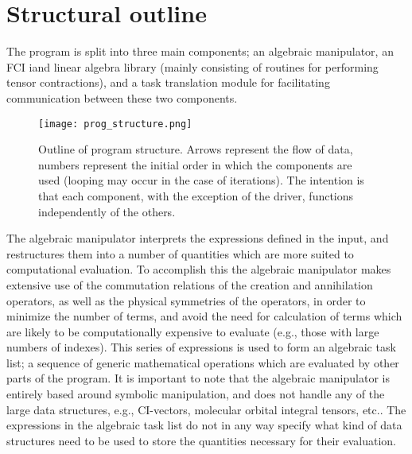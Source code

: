 \section{Structural outline}
\noindent The program is split into three main components; an algebraic manipulator, an FCI
iand linear algebra library (mainly consisting of routines for performing tensor contractions),
and a task translation module for facilitating communication between these two components.\\

\begin{figure}[!ht]
\begin{center}
\texttt{[image: prog\_structure.png]}
\caption{ Outline of program structure. Arrows represent the flow of data, numbers represent the
initial order in which the components are used (looping may occur in the case of iterations).
The intention is that each component, with the exception of the driver, functions independently of the others.}
\end{center}
\label{fig:prog_structure}
\end{figure}

\noindent The algebraic manipulator interprets the expressions defined
in the input, and restructures them into a number of quantities which are
more suited to computational evaluation. To accomplish this the
algebraic manipulator makes extensive use of the commutation
relations of the creation and annihilation operators, as well as the physical
symmetries of the operators, in order to minimize the number of terms, and
avoid the need for calculation of terms which are likely to be computationally
expensive to evaluate (e.g., those with large numbers of indexes). This series
of expressions is used to form an algebraic task list; a sequence of
generic mathematical operations which are evaluated by other parts of the program.
It is important to note that the algebraic manipulator is entirely based around symbolic manipulation,
and does not handle any of the large data structures, e.g., CI-vectors,
molecular orbital integral tensors, etc.. The expressions in the algebraic
task list do not in any way specify what kind of data structures need to
be used to store the quantities necessary for their evaluation.\\

